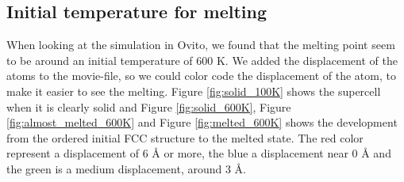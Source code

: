 \subsection{Initial temperature for melting}

When looking at the simulation in Ovito, we found that the melting point seem to be around an initial temperature of 600 K. We added the displacement of the atoms to the movie-file, so we could color code the displacement of the atom, to make it easier to see the melting. Figure \ref{fig:solid_100K} shows the supercell when it is clearly solid and Figure \ref{fig:solid_600K}, Figure \ref{fig:almost_melted_600K} and Figure \ref{fig:melted_600K} shows the development from the ordered initial FCC structure to the melted state. The red color represent a displacement of 6 Å or more, the blue a displacement near 0 Å and the green is a medium displacement, around 3 Å. 

